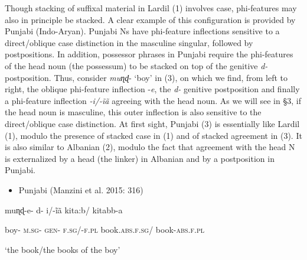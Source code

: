 \documentclass[output=paper]{langsci/langscibook}
\begin{document}
\begin{styleSfondomedioiColorexxi}
Though stacking of suffixal material in Lardil (1) involves case, phi-features may also in principle be stacked. A clear example of this configuration is provided by Punjabi (Indo-Aryan). Punjabi Ns have phi-feature inflections sensitive to a direct/oblique case distinction in the masculine singular, followed by postpositions. In addition, possessor phrases in Punjabi require the phi-features of the head noun (the possessum) to be stacked on top of the genitive \textit{d-} postposition. Thus, consider \textit{muɳɖ}{}- ‘boy’ in (3), on which we find, from left to right, the oblique phi-feature inflection -\textit{e}, the \textit{d-} genitive postposition and finally a phi-feature inflection \textit{{}-}\textit{i/-ĩã} agreeing with the head noun. As we will see in §3, if the head noun is masculine, this outer inflection is also sensitive to the direct/oblique case distinction. At first sight, Punjabi (3) is essentially like Lardil (1), modulo the presence of stacked case in (1) and of stacked agreement in (3). It is also similar to Albanian (2), modulo the fact that agreement with the head N is externalized by a head (the linker) in Albanian and by a postposition in Punjabi. 
\end{styleSfondomedioiColorexxi}

\begin{itemize}
\item \begin{styleSfondomedioiColorexxi}
Punjabi (Manzini et al. 2015: 316)
\end{styleSfondomedioiColorexxi}\end{itemize}
\begin{styleSfondomedioiColorexxi}
muɳɖ-e-  d-  i/-ĩã    kita:b/      kitabb-a  
\end{styleSfondomedioiColorexxi}

\begin{styleSfondomedioiColorexxi}
  boy-  \textsc{m.sg-  gen-  f.sg/-f.pl}  book.\textsc{abs.f.sg}/   book-\textsc{abs.f.pl}
\end{styleSfondomedioiColorexxi}

\begin{styleSfondomedioiColorexxi}
  ‘the book/the books of the boy’   
\end{styleSfondomedioiColorexxi}
\end{document}
